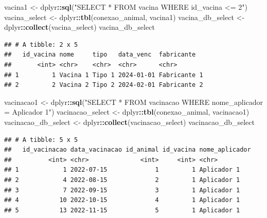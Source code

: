 \documentclass[
]{article}
\newenvironment{Shaded}{\begin{snugshade}}{\end{snugshade}}
\newcommand{\FunctionTok}[1]{\textcolor[rgb]{0.13,0.29,0.53}{\textbf{#1}}}
\newcommand{\NormalTok}[1]{#1}
\newcommand{\OtherTok}[1]{\textcolor[rgb]{0.56,0.35,0.01}{#1}}
\newcommand{\SpecialCharTok}[1]{\textcolor[rgb]{0.81,0.36,0.00}{\textbf{#1}}}
\newcommand{\StringTok}[1]{\textcolor[rgb]{0.31,0.60,0.02}{#1}}
\begin{document}
\begin{Shaded}
\begin{Highlighting}[]
\NormalTok{vacina1 }\OtherTok{\textless{}{-}}\NormalTok{ dplyr}\SpecialCharTok{::}\FunctionTok{sql}\NormalTok{(}\StringTok{"SELECT * FROM vacina WHERE id\_vacina \textless{}= 2"}\NormalTok{)}
\NormalTok{vacina\_select }\OtherTok{\textless{}{-}}\NormalTok{ dplyr}\SpecialCharTok{::}\FunctionTok{tbl}\NormalTok{(conexao\_animal, vacina1)}
\NormalTok{vacina\_db\_select }\OtherTok{\textless{}{-}}\NormalTok{ dplyr}\SpecialCharTok{::}\FunctionTok{collect}\NormalTok{(vacina\_select)}
\NormalTok{vacina\_db\_select}
\end{Highlighting}
\end{Shaded}

\begin{verbatim}
## # A tibble: 2 x 5
##   id_vacina nome     tipo   data_venc  fabricante  
##       <int> <chr>    <chr>  <chr>      <chr>       
## 1         1 Vacina 1 Tipo 1 2024-01-01 Fabricante 1
## 2         2 Vacina 2 Tipo 2 2024-02-01 Fabricante 2
\end{verbatim}

\begin{Shaded}
\begin{Highlighting}[]
\NormalTok{vacinacao1 }\OtherTok{\textless{}{-}}\NormalTok{ dplyr}\SpecialCharTok{::}\FunctionTok{sql}\NormalTok{(}\StringTok{"SELECT * FROM vacinacao WHERE nome\_aplicador = \textquotesingle{}Aplicador 1\textquotesingle{}"}\NormalTok{)}
\NormalTok{vacinacao\_select }\OtherTok{\textless{}{-}}\NormalTok{ dplyr}\SpecialCharTok{::}\FunctionTok{tbl}\NormalTok{(conexao\_animal, vacinacao1)}
\NormalTok{vacinacao\_db\_select }\OtherTok{\textless{}{-}}\NormalTok{ dplyr}\SpecialCharTok{::}\FunctionTok{collect}\NormalTok{(vacinacao\_select)}
\NormalTok{vacinacao\_db\_select}
\end{Highlighting}
\end{Shaded}

\begin{verbatim}
## # A tibble: 5 x 5
##   id_vacinacao data_vacinacao id_animal id_vacina nome_aplicador
##          <int> <chr>              <int>     <int> <chr>         
## 1            1 2022-07-15             1         1 Aplicador 1   
## 2            4 2022-08-15             2         1 Aplicador 1   
## 3            7 2022-09-15             3         1 Aplicador 1   
## 4           10 2022-10-15             4         1 Aplicador 1   
## 5           13 2022-11-15             5         1 Aplicador 1
\end{verbatim}
\end{document}
